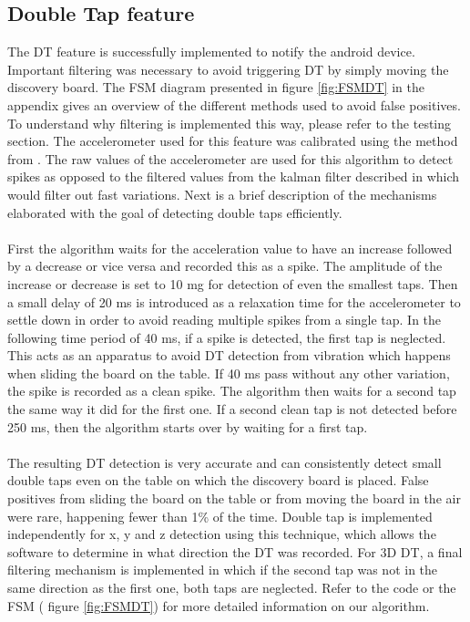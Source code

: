 \documentclass[12pt]{article}
\begin{document}
\subsection{Double Tap feature}
The DT feature is successfully implemented to notify the android device. Important filtering was necessary to avoid triggering DT by simply moving the discovery board. The FSM diagram presented in figure \ref{fig:FSMDT} in the appendix gives an overview of the different methods used to avoid false positives. To understand why filtering is implemented this way, please refer to the testing section. The accelerometer used for this feature was calibrated using the method from \cite{Lab4report}. The raw values of the accelerometer are used for this algorithm to detect spikes as opposed to the filtered values from the kalman filter described in \cite{Lab2report} which would filter out fast variations. Next is a brief description of the mechanisms elaborated with the goal of detecting double taps efficiently.
\paragraph{}
First the algorithm waits for the acceleration value to have an increase followed by a decrease or vice versa and recorded this as a spike. The amplitude of the increase or decrease is set to 10 mg for detection of even the smallest taps. Then a small delay of 20 ms is introduced as a relaxation time for the accelerometer to settle down in order to avoid reading multiple spikes from a single tap. In the following time period of 40 ms, if a spike is detected, the first tap is neglected. This acts as an apparatus to avoid DT detection from vibration which happens when sliding the board on the table. If 40 ms pass without any other variation, the spike is recorded as a clean spike. The algorithm then waits for a second tap the same way it did for the first one. If a second clean tap is not detected before 250 ms, then the algorithm starts over by waiting for a first tap.
\paragraph{}
The resulting DT detection is very accurate and can consistently detect small double taps even on the table on which the discovery board is placed. False positives from sliding the board on the table or from moving the board in the air were rare, happening fewer than 1\% of the time.
Double tap is implemented independently for x, y and z detection using this technique, which allows the software to determine in what direction the DT was recorded. For 3D DT, a final filtering mechanism is implemented in which if the second tap was not in the same direction as the first one, both taps are neglected. Refer to the code or the FSM ( figure \ref{fig:FSMDT}) for more detailed information on our algorithm.
\end{document}

